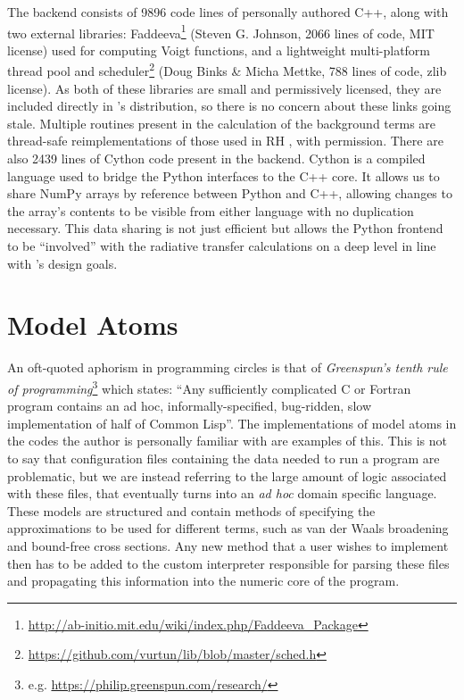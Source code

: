 The backend consists of 9896 code lines of personally authored C++, along with two external libraries: Faddeeva\footnote{\url{http://ab-initio.mit.edu/wiki/index.php/Faddeeva_Package}} (Steven G. Johnson, 2066 lines of code, MIT license) used for computing Voigt functions, and a lightweight multi-platform thread pool and scheduler\footnote{\url{https://github.com/vurtun/lib/blob/master/sched.h}} (Doug Binks \& Micha Mettke, 788 lines of code, zlib license).
As both of these libraries are small and permissively licensed, they are included directly in \Lw{}'s distribution, so there is no concern about these links going stale.
Multiple routines present in the calculation of the background terms are thread-safe reimplementations of those used in RH \citep{Uitenbroek2001}, with permission.
There are also 2439 lines of Cython \citep{Behnel2011} code present in the backend.
Cython is a compiled language used to bridge the Python interfaces to the C++ core.
It allows us to share NumPy \citep{Harris2020} arrays by reference between Python and C++, allowing changes to the array's contents to be visible from either language with no duplication necessary.
This data sharing is not just efficient but allows the Python frontend to be ``involved'' with the radiative transfer calculations on a deep level in line with \Lw{}'s design goals.

\section{Model Atoms}

An oft-quoted aphorism in programming circles is that of \emph{Greenspun's tenth rule of programming}\footnote{e.g. \url{https://philip.greenspun.com/research/}} which states: ``Any sufficiently complicated C or Fortran program contains an ad hoc, informally-specified, bug-ridden, slow implementation of half of Common Lisp''.
The implementations of model atoms in the codes the author is personally familiar with are examples of this.
This is not to say that configuration files containing the data needed to run a program are problematic, but we are instead referring to the large amount of logic associated with these files, that eventually turns into an \emph{ad hoc} domain specific language.
These models are structured and contain methods of specifying the approximations to be used for different terms, such as van der Waals broadening and bound-free cross sections.
Any new method that a user wishes to implement then has to be added to the custom interpreter responsible for parsing these files and propagating this information into the numeric core of the program.

